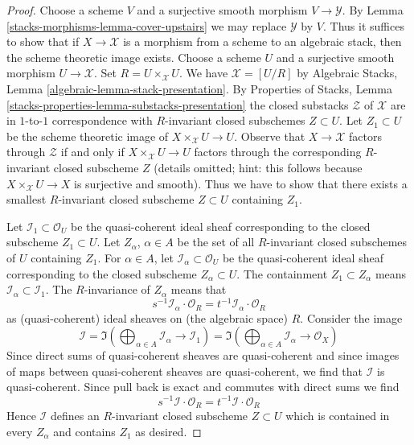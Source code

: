 \begin{proof}
Choose a scheme $V$ and a surjective smooth morphism $V \to \mathcal{Y}$.
By Lemma \ref{stacks-morphisms-lemma-cover-upstairs} we may replace $\mathcal{Y}$ by $V$.
Thus it suffices to show that if $X \to \mathcal{X}$ is a morphism from
a scheme to an algebraic stack, then the scheme theoretic image exists.
Choose a scheme $U$ and a surjective smooth morphism $U \to \mathcal{X}$.
Set $R = U \times_\mathcal{X} U$.
We have $\mathcal{X} = [U/R]$ by
Algebraic Stacks, Lemma \ref{algebraic-lemma-stack-presentation}.
By Properties of Stacks, Lemma
\ref{stacks-properties-lemma-substacks-presentation}
the closed substacks $\mathcal{Z}$ of $\mathcal{X}$
are in $1$-to-$1$ correspondence with $R$-invariant
closed subschemes $Z \subset U$.
Let $Z_1 \subset U$ be the scheme theoretic image of
$X \times_\mathcal{X} U \to U$.
Observe that $X \to \mathcal{X}$ factors through $\mathcal{Z}$
if and only if $X \times_\mathcal{X} U \to U$ factors through
the corresponding $R$-invariant closed subscheme $Z$
(details omitted; hint: this follows because
$X \times_\mathcal{X} U \to X$ is surjective and smooth).
Thus we have to show that there exists a smallest $R$-invariant
closed subscheme $Z \subset U$ containing $Z_1$.

\medskip\noindent
Let $\mathcal{I}_1 \subset \mathcal{O}_U$ be the quasi-coherent
ideal sheaf corresponding to the closed subscheme $Z_1 \subset U$.
Let $Z_\alpha$, $\alpha \in A$ be the set of all $R$-invariant
closed subschemes of $U$ containing $Z_1$.
For $\alpha \in A$, let $\mathcal{I}_\alpha \subset \mathcal{O}_U$
be the quasi-coherent ideal sheaf corresponding to the closed subscheme
$Z_\alpha \subset U$. The containment $Z_1 \subset Z_\alpha$
means $\mathcal{I}_\alpha \subset \mathcal{I}_1$.
The $R$-invariance of $Z_\alpha$ means that
$$
s^{-1}\mathcal{I}_\alpha \cdot \mathcal{O}_R =
t^{-1}\mathcal{I}_\alpha \cdot \mathcal{O}_R
$$
as (quasi-coherent) ideal sheaves on (the algebraic space) $R$.
Consider the image
$$
\mathcal{I} =
\Im\left(
\bigoplus\nolimits_{\alpha \in A} \mathcal{I}_\alpha \to \mathcal{I}_1
\right) =
\Im\left(
\bigoplus\nolimits_{\alpha \in A} \mathcal{I}_\alpha \to \mathcal{O}_X
\right)
$$
Since direct sums of quasi-coherent sheaves are quasi-coherent
and since images of maps between quasi-coherent sheaves are
quasi-coherent, we find that $\mathcal{I}$ is quasi-coherent.
Since pull back is exact and commutes with direct sums we find
$$
s^{-1}\mathcal{I} \cdot \mathcal{O}_R =
t^{-1}\mathcal{I} \cdot \mathcal{O}_R
$$
Hence $\mathcal{I}$ defines an $R$-invariant closed subscheme
$Z \subset U$ which is contained in every $Z_\alpha$ and contains
$Z_1$ as desired.
\end{proof}

